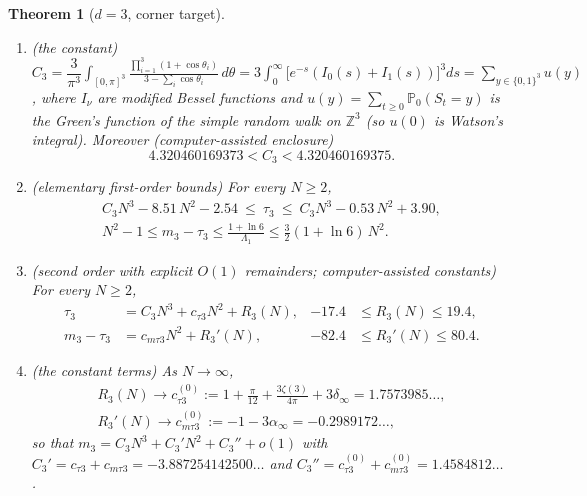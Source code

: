 \documentclass[11pt,a4paper]{article}
\newcommand{\Z}{\mathbb Z}
\newcommand{\PP}{\mathbb P}
\theoremstyle{plain}
\newtheorem{theorem}{Theorem}[section]
\theoremstyle{definition}
\numberwithin{equation}{section}
\begin{document}
\begin{theorem}[$d=3$, corner target]\label{thm:d3}
\begin{enumerate}
\item[(a)] \emph{(the constant)} $C_3=\dfrac{3}{\pi^3}\displaystyle\int_{[0,\pi]^3}\frac{\prod_{i=1}^3(1+\cos\theta_i)}{3-\sum_i\cos\theta_i}\,d\theta=3\int_0^\infty\big[e^{-s}(I_0(s)+I_1(s))\big]^3ds=\sum_{y\in\{0,1\}^3}u(y)$, where $I_\nu$ are modified Bessel functions and $u(y)=\sum_{t\ge0}\PP_0(S_t=y)$ is the Green's function of the simple random walk on $\Z^3$ (so $u(0)$ is Watson's integral). Moreover (computer-assisted enclosure)
\[
4.320460169373<C_3<4.320460169375 .
\]
\item[(b)] \emph{(elementary first-order bounds)} For every $N\ge2$,
\begin{equation}\label{eq:tau3}
\begin{gathered}C_3N^3-8.51\,N^2-2.54\ \le\ \tau_3\ \le\ C_3N^3-0.53\,N^2+3.90,\\ N^2-1\le m_3-\tau_3\le\frac{1+\ln6}{\Lambda_1}\le\tfrac32(1+\ln 6)\,N^2 .\end{gathered}
\end{equation}
\item[(c)] \emph{(second order with explicit $O(1)$ remainders; computer-assisted constants)} For every $N\ge2$,
\begin{equation}\label{eq:tau3sharp}
\begin{aligned}
\tau_3&=C_3N^3+c_{\tau3}N^2+R_3(N),&-17.4&\le R_3(N)\le19.4,\\
m_3-\tau_3&=c_{m\tau3}N^2+R_3'(N),&-82.4&\le R_3'(N)\le80.4 .
\end{aligned}
\end{equation}
\item[(d)] \emph{(the constant terms)} As $N\to\infty$,
\begin{gather*}
R_3(N)\to c^{(0)}_{\tau3}:=1+\frac{\pi}{12}+\frac{3\zeta(3)}{4\pi}+3\delta_\infty=1.7573985\ldots,\\
R_3'(N)\to c^{(0)}_{m\tau3}:=-1-3\alpha_\infty=-0.2989172\ldots,
\end{gather*}
so that $m_3=C_3N^3+C_3'N^2+C_3''+o(1)$ with $C_3'=c_{\tau3}+c_{m\tau3}=-3.887254142500\ldots$ and $C_3''=c^{(0)}_{\tau3}+c^{(0)}_{m\tau3}=1.4584812\ldots$ .
\end{enumerate}
\end{theorem}
\end{document}
